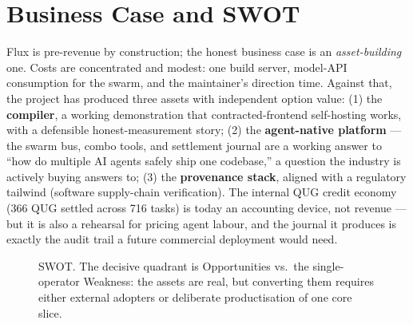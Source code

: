 \section{Business Case and SWOT}

Flux is pre-revenue by construction; the honest business case is an \emph{asset-building} one. Costs are concentrated and modest: one build server, model-API consumption for the swarm, and the maintainer's direction time. Against that, the project has produced three assets with independent option value: (1) the \textbf{compiler}, a working demonstration that contracted-frontend self-hosting works, with a defensible honest-measurement story; (2) the \textbf{agent-native platform} --- the swarm bus, combo tools, and settlement journal are a working answer to ``how do multiple AI agents safely ship one codebase,'' a question the industry is actively buying answers to; (3) the \textbf{provenance stack}, aligned with a regulatory tailwind (software supply-chain verification). The internal QUG credit economy (366 QUG settled across 716 tasks) is today an accounting device, not revenue --- but it is also a rehearsal for pricing agent labour, and the journal it produces is exactly the audit trail a future commercial deployment would need.

\begin{figure}[h]
\centering
{}
\caption{SWOT. The decisive quadrant is Opportunities vs.\ the single-operator Weakness: the assets are real, but converting them requires either external adopters or deliberate productisation of one core slice.}
\label{fig:swot}
\end{figure}

